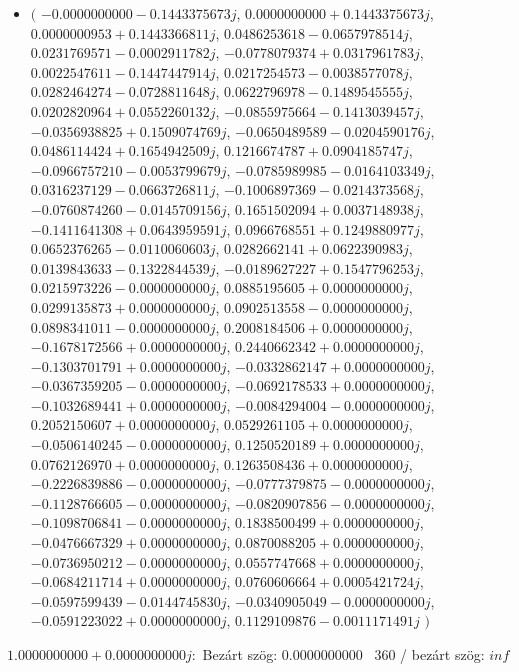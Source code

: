 \documentclass[14pt,a4paper]{article}
\begin{document}
\begin{itemize}
\item
$\big($
$-0.0000000000-0.1443375673j$, $0.0000000000+0.1443375673j$, $0.0000000953+0.1443366811j$, $0.0486253618-0.0657978514j$, $0.0231769571-0.0002911782j$, $-0.0778079374+0.0317961783j$, $0.0022547611-0.1447447914j$, $0.0217254573-0.0038577078j$, $0.0282464274-0.0728811648j$, $0.0622796978-0.1489545555j$, $0.0202820964+0.0552260132j$, $-0.0855975664-0.1413039457j$, $-0.0356938825+0.1509074769j$, $-0.0650489589-0.0204590176j$, $0.0486114424+0.1654942509j$, $0.1216674787+0.0904185747j$, $-0.0966757210-0.0053799679j$, $-0.0785989985-0.0164103349j$, $0.0316237129-0.0663726811j$, $-0.1006897369-0.0214373568j$, $-0.0760874260-0.0145709156j$, $0.1651502094+0.0037148938j$, $-0.1411641308+0.0643959591j$, $0.0966768551+0.1249880977j$, $0.0652376265-0.0110060603j$, $0.0282662141+0.0622390983j$, $0.0139843633-0.1322844539j$, $-0.0189627227+0.1547796253j$, $0.0215973226-0.0000000000j$, $0.0885195605+0.0000000000j$, $0.0299135873+0.0000000000j$, $0.0902513558-0.0000000000j$, $0.0898341011-0.0000000000j$, $0.2008184506+0.0000000000j$, $-0.1678172566+0.0000000000j$, $0.2440662342+0.0000000000j$, $-0.1303701791+0.0000000000j$, $-0.0332862147+0.0000000000j$, $-0.0367359205-0.0000000000j$, $-0.0692178533+0.0000000000j$, $-0.1032689441+0.0000000000j$, $-0.0084294004-0.0000000000j$, $0.2052150607+0.0000000000j$, $0.0529261105+0.0000000000j$, $-0.0506140245-0.0000000000j$, $0.1250520189+0.0000000000j$, $0.0762126970+0.0000000000j$, $0.1263508436+0.0000000000j$, $-0.2226839886-0.0000000000j$, $-0.0777379875-0.0000000000j$, $-0.1128766605-0.0000000000j$, $-0.0820907856-0.0000000000j$, $-0.1098706841-0.0000000000j$, $0.1838500499+0.0000000000j$, $-0.0476667329+0.0000000000j$, $0.0870088205+0.0000000000j$, $-0.0736950212-0.0000000000j$, $0.0557747668+0.0000000000j$, $-0.0684211714+0.0000000000j$, $0.0760606664+0.0005421724j$, $-0.0597599439-0.0144745830j$, $-0.0340905049-0.0000000000j$, $-0.0591223022+0.0000000000j$, $0.1129109876-0.0011171491j$
$\big)$
\end{itemize}
$1.0000000000+0.0000000000j$:\
Bezárt szög: $0.0000000000$ \
360 / bezárt szög: $inf$\
\end{document}
